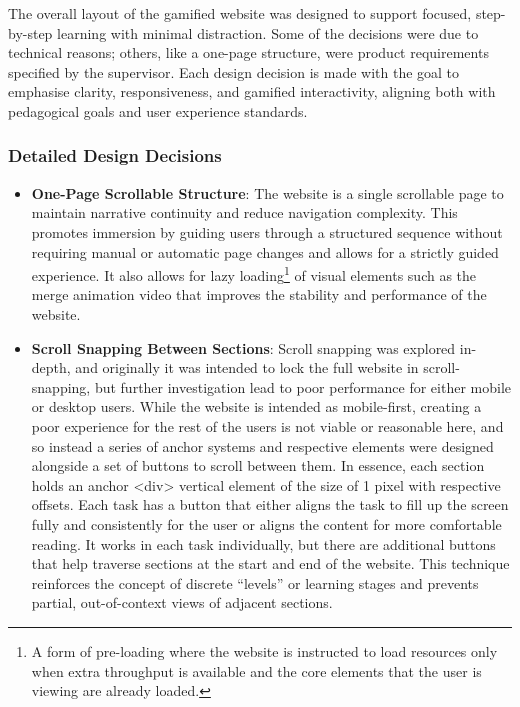 The overall layout of the gamified website was designed to support focused, step-by-step learning with minimal distraction. 
Some of the decisions were due to technical reasons; others, like a one-page structure, were product requirements specified by the supervisor.
Each design decision is made with the goal to emphasise clarity, responsiveness, and gamified interactivity, aligning both with pedagogical goals and user experience standards.

\subsubsection{Detailed Design Decisions}

\begin{itemize}
    \item \textbf{One-Page Scrollable Structure}: The website is a single scrollable page to maintain narrative continuity and reduce navigation complexity. 
    This promotes immersion by guiding users through a structured sequence without requiring manual or automatic page changes and allows for a strictly guided experience. 
    It also allows for lazy loading\footnote{A form of pre-loading where the website is instructed to load resources only when extra throughput is available and the core elements that the user is viewing are already loaded.} of visual elements such as the merge animation video that improves the stability and performance of the website.
    \item \textbf{Scroll Snapping Between Sections}: Scroll snapping was explored in-depth, and originally it was intended to lock the full website in scroll-snapping, but further investigation lead to poor performance for either mobile or desktop users. 
    While the website is intended as mobile-first, creating a poor experience for the rest of the users is not viable or reasonable here, and so instead a series of anchor systems and respective elements were designed alongside a set of buttons to scroll between them. 
    In essence, each section holds an anchor <div> vertical element of the size of 1 pixel with respective offsets. 
    Each task has a button that either aligns the task to fill up the screen fully and consistently for the user or aligns the content for more comfortable reading. 
    It works in each task individually, but there are additional buttons that help traverse sections at the start and end of the website. 
    This technique reinforces the concept of discrete “levels” or learning stages and prevents partial, out-of-context views of adjacent sections.

\end{itemize}
